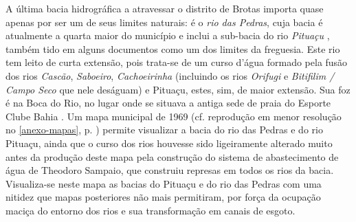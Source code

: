 A última bacia hidrográfica a atravessar o distrito de Brotas importa quase apenas por ser um de seus limites naturais: é o \textit{rio das Pedras}, cuja bacia é atualmente a quarta maior do município e inclui a sub-bacia do rio \textit{Pituaçu} \cite[p.~175]{santos_aguas_2010}, também tido em alguns documentos como um dos limites da freguesia. Este rio tem leito de curta extensão, pois trata-se de um curso d'água formado pela fusão dos rios \textit{Cascão}, \textit{Saboeiro}, \textit{Cachoeirinha} (incluindo os rios \textit{Orifugi} e \textit{Bitifilim / Campo Seco} que nele deságuam) e Pituaçu, estes, sim, de maior extensão. Sua foz é na Boca do Rio, no lugar onde se situava a antiga sede de praia do Esporte Clube Bahia \cite[p.~175]{santos_aguas_2010}. Um mapa municipal de 1969 \cite{salvador_mapa_1969} (cf. reprodução em menor resolução no \autoref{anexo-mapas}, p. \pageref{fig:1969-mapaprefeitura}) permite visualizar a bacia do rio das Pedras e do rio Pituaçu, ainda que o curso dos rios houvesse sido ligeiramente alterado muito antes da produção deste mapa pela construção do sistema de abastecimento de água de Theodoro Sampaio, que construiu represas em todos os rios da bacia. Visualiza-se neste mapa as bacias do Pituaçu e do rio das Pedras com uma nitidez que mapas posteriores não mais permitiram, por força da ocupação maciça do entorno dos rios e sua transformação em canais de esgoto.

